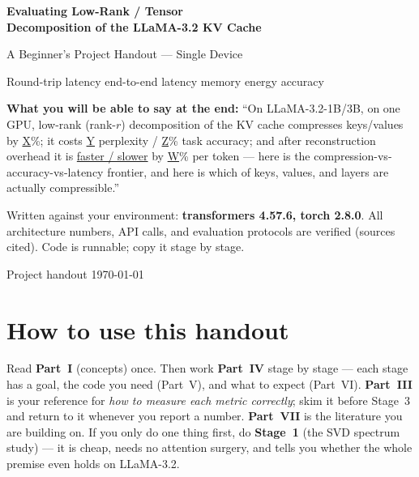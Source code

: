 \documentclass[11pt]{article}
\begin{document}
\begin{titlepage}
\centering
\vspace*{1.3cm}
{\Huge\bfseries\color{accent} Evaluating Low-Rank / Tensor\\[2pt] Decomposition of the LLaMA-3.2 KV Cache\par}
\vspace{0.5cm}
{\Large A Beginner's Project Handout --- Single Device\par}
\vspace{0.5cm}
{\large Round-trip latency \;\textbullet\; end-to-end latency \;\textbullet\; memory \;\textbullet\; energy \;\textbullet\; accuracy\par}
\vspace{1.3cm}
\begin{tcolorbox}[colback=accent!6,colframe=accent,width=0.93\textwidth,arc=3pt]
\centering
\textbf{What you will be able to say at the end:} ``On LLaMA-3.2-1B/3B, on one GPU, low-rank
(rank-$r$) decomposition of the KV cache compresses keys/values by \underline{X}\%; it costs
\underline{Y} perplexity / \underline{Z}\% task accuracy; and after reconstruction overhead it
is \underline{faster / slower} by \underline{W}\% per token --- here is the compression-vs-accuracy-vs-latency
frontier, and here is which of keys, values, and layers are actually compressible.''
\end{tcolorbox}
\vspace{0.9cm}
\begin{tcolorbox}[colback=softgray,colframe=accent,width=0.93\textwidth,arc=3pt]
\centering\small
Written against your environment: \textbf{transformers 4.57.6, torch 2.8.0}. All architecture
numbers, API calls, and evaluation protocols are verified (sources cited). Code is runnable;
copy it stage by stage.
\end{tcolorbox}
\vfill
{\normalsize Project handout \;\textbullet\; \today\par}
\end{titlepage}

\tableofcontents
\newpage

\section*{How to use this handout}

Read \textbf{Part~I} (concepts) once. Then work \textbf{Part~IV} stage by stage --- each stage
has a goal, the code you need (Part~V), and what to expect (Part~VI). \textbf{Part~III} is your
reference for \emph{how to measure each metric correctly}; skim it before Stage~3 and return to
it whenever you report a number. \textbf{Part~VII} is the literature you are building on. If you
only do one thing first, do \textbf{Stage~1} (the SVD spectrum study) --- it is cheap, needs no
attention surgery, and tells you whether the whole premise even holds on LLaMA-3.2.
\end{document}
